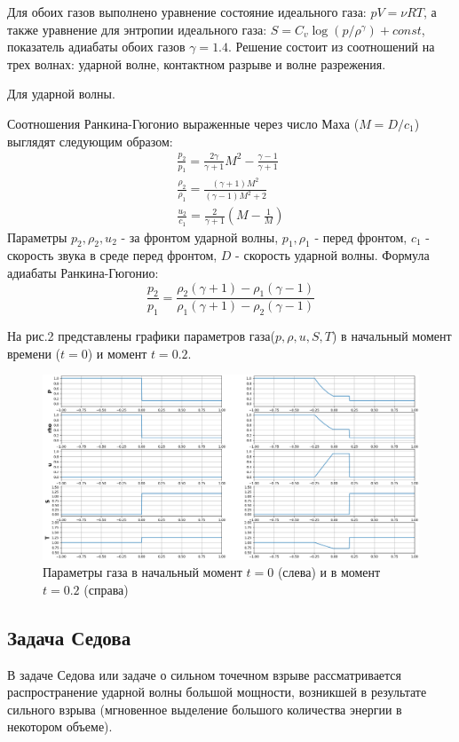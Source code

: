 \documentclass[a4paper,12pt]{extarticle}
\begin{document}
Для обоих газов выполнено уравнение состояние идеального газа: $ pV = \nu RT$, а также уравнение для энтропии идеального газа: $S = C_v\log(p/\rho^\gamma)+const$, показатель адиабаты обоих газов $\gamma = 1.4$.
Решение состоит из соотношений на трех волнах: ударной волне, контактном разрыве и волне разрежения. 

Для ударной волны.

Соотношения Ранкина-Гюгонио выраженные через число Маха ($M= D/c_1$) выглядят следующим образом:
\begin{align} 
    \frac{p_2}{p_1} = \frac{2\gamma}{\gamma+1}M^2-\frac{\gamma-1}{\gamma+1} \\
    \frac{\rho_2}{\rho_1} = \frac{(\gamma+1)M^2}{(\gamma-1)M^2+2} \\
    \frac{u_2}{c_1} = \frac{2}{\gamma+1}(M-\frac{1}{M})
\end{align}
Параметры $ p_2, \rho_2, u_2 $ - за фронтом ударной волны, $ p_1, \rho_1$ - перед фронтом, $c_1$  - скорость звука в среде перед фронтом, $D$ - скорость ударной волны.
Формула адиабаты Ранкина-Гюгонио:
$$\frac{p_2}{p_1}=\frac{\rho_2(\gamma+1)-\rho_1(\gamma-1)}{\rho_1(\gamma+1)-\rho_2(\gamma-1)}$$


На рис.2 представлены графики параметров газа($p,\rho,u, S, T$) в начальный момент времени ($t=0$) и момент $t=0.2$.
\clearpage
\begin{figure}[!htb]
	\centering
	\includegraphics[width=1\textwidth]{2 time moments (no time).png}
	\caption{
		Параметры газа в начальный момент $t=0$ (слева) и в момент $t=0.2$ (справа)
	}
	\label{fig:time_moments}
\end{figure}
\subsection{Задача Седова}
В задаче Седова или задаче о сильном точечном взрыве рассматривается распространение ударной волны большой мощности, возникшей в результате сильного взрыва (мгновенное выделение большого количества энергии в некотором объеме).
\end{document}

